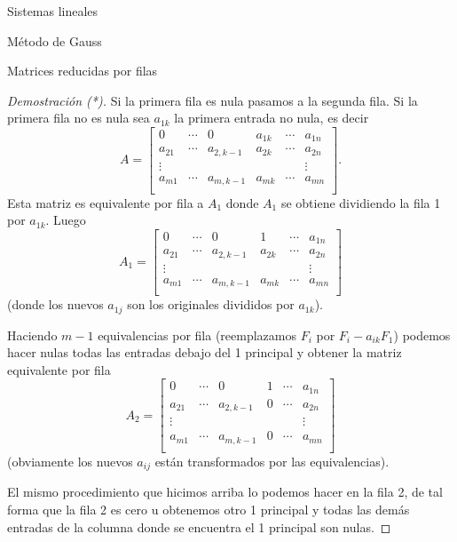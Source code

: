 \documentclass[a4paper,12pt,twoside,spanish,reqno]{amsbook}
\theoremstyle{definition}
\theoremstyle{remark}
\begin{document}
\begin{chapter}{Sistemas lineales}
\begin{section}{Método de Gauss }
\begin{subsection}{Matrices reducidas por filas}
\begin{proof}[Demostración (*)]
					Si la primera fila es nula pasamos a la segunda fila. Si la primera fila no es nula sea $a_{1k}$ la primera entrada no nula, es decir
					\begin{equation*}
					A = \begin{bmatrix}
					0 & \cdots & 0 & a_{1k} & \cdots & a_{1n} \\
					a_{21}& \cdots & a_{2,k-1} & a_{2k} & \cdots & a_{2n} \\
					\vdots&  &  &  &  & \vdots \\
					a_{m1}& \cdots & a_{m,k-1} & a_{mk} & \cdots & a_{mn} \\
					\end{bmatrix}.
					\end{equation*} 
					Esta matriz es equivalente por fila a $A_1$ donde $A_1$ se obtiene dividiendo la fila 1 por $a_{1k}$. Luego 
					\begin{equation*}
					A_1 = \begin{bmatrix}
					0 & \cdots & 0 & 1 & \cdots & a_{1n} \\
					a_{21}& \cdots & a_{2,k-1} & a_{2k} & \cdots & a_{2n} \\
					\vdots&  &  &  &  & \vdots \\
					a_{m1}& \cdots & a_{m,k-1} & a_{mk} & \cdots & a_{mn} \\
					\end{bmatrix}
					\end{equation*}
					(donde los nuevos $a_{1j}$ son  los originales divididos por $a_{1k}$).  
					
					Haciendo $m-1$ equivalencias por fila (reemplazamos $F_i$ por $F_i - a_{ik}F_1$) podemos hacer nulas todas las entradas debajo del  1 principal y obtener la matriz equivalente por fila
					\begin{equation*}
					A_2 = \begin{bmatrix}
					0 & \cdots & 0 & 1 & \cdots & a_{1n} \\
					a_{21}& \cdots & a_{2,k-1} & 0 & \cdots & a_{2n} \\
					\vdots&  &  &  &  & \vdots \\
					a_{m1}& \cdots & a_{m,k-1} &0 & \cdots & a_{mn} \\
					\end{bmatrix}
					\end{equation*}
					(obviamente los nuevos $a_{ij}$ están transformados por las equivalencias).
					
					El mismo procedimiento que hicimos arriba lo podemos hacer en la fila 2,  de tal forma que la fila 2 es cero u obtenemos otro 1 principal y todas las demás entradas de la columna donde se encuentra el 1 principal son nulas. 
					

\end{proof}
\end{subsection}
\end{section}
\end{chapter}
\end{document}
